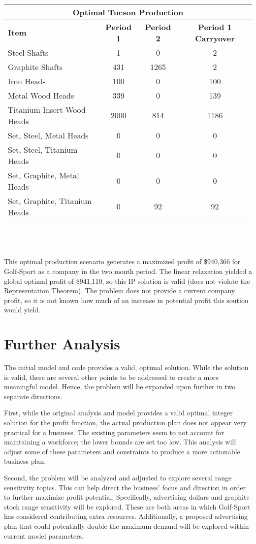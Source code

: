 \documentclass{article}
\begin{document}
\vspace{5mm}
\\
\noindent
\begin{tabular}{ l c c c }
\hline
\multicolumn{4}{|c|}{Optimal Tucson Production} \\
\hline
\textbf{Item} & \textbf{Period 1} & \textbf{Period 2} & \textbf{Period 1 Carryover} \\
Steel Shafts & 1 & 0 & 2 \\
Graphite Shafts & 431 & 1265 & 2 \\
Iron Heads & 100 & 0 & 100 \\
Metal Wood Heads & 339 & 0 & 139 \\
Titanium Insert Wood Heads & 2000 & 814 & 1186 \\
Set, Steel, Metal Heads & 0 & 0 & 0 \\
Set, Steel, Titanium Heads & 0 & 0 & 0 \\
Set, Graphite, Metal Heads & 0 & 0 & 0 \\
Set, Graphite, Titanium Heads & 0 & 92 & 92\\
\end{tabular}
\\
\\
\vspace{5mm}
\\

This optimal production scenario generates a maximized profit of \$940,366 for Golf-Sport as a company in the two month period.  The linear relaxation yielded a global optimal profit of \$941,110, so this 
IP solution is valid (does not violate the Representation Theorem).  The problem does not provide a current company profit, so it is not known how much of an increase in potential profit this soution would yield.  

\section{Further Analysis}
The initial model and code provides a valid, optimal solution.  While the solution is valid, there are several other points to be addressed to create a more meaningful model.  Hence, the problem will be expanded upon further in two separate directions.
\par
First, while the original analysis and model provides a valid optimal integer solution for the profit function, the actual production plan does not appear very practical for a business.  
The existing parameters seem to not account for maintaining a workforce; the lower bounds are set too low.  This analysis will adjust some of these parameters and constraints to produce a more 
actionable business plan.
\par
Second, the problem will be analyzed and adjusted to explore several range sensitivity topics.  This can help direct the business' focus and direction in order to further maximize profit potential.  Specifically, advertising dollars and graphite stock range sensitivity will be explored.  These are both areas in which Golf-Sport has considered contributing extra resources.  Additionally, a proposed advertising plan 
that could potentially double the maximum demand will be explored within current model parameters.
\end{document}
